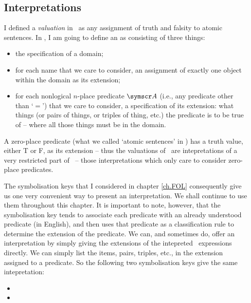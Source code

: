 \begin{earg}
\section{Interpretations} \label{ss.int}
I defined a \emph{valuation} in \TFL\ as any assignment of truth and falsity to atomic sentences. In \FOL, I am going to define an  as consisting of three things:
	\begin{itemize}	
		\item the specification of a domain;
		\item for each name that we care to consider, an assignment of exactly one object within the domain as its extension;
		\item for each nonlogical $n$-place predicate $\meta{A}$ (i.e., any predicate other than `$=$') that we care to consider, a specification of its extension: what things (or pairs of things, or triples of thing, etc.) the predicate is to be true of – where all those things must be in the domain.
	\end{itemize}
A zero-place predicate (what we called `atomic sentences' in \TFL) has a truth value, either T or F, as its extension – thus the valuations of \TFL\ are intepretations of a very restricted part of \FOL\ – those interpretations which only care to consider zero-place predicates.

The symbolisation keys that I considered in chapter \ref{ch.FOL} consequently give us one very convenient way to present an interpretation. We shall continue to use them throughout this chapter. It is important to note, however, that the symbolisation key tends to associate each predicate with an already understood predicate (in English), and then uses that predicate as a classification rule to determine the extension of the predicate. We can, and sometimes do, offer an interpretation by simply giving the extensions of the intepreted \FOL\ expressions directly. We can simply list the items, pairs, triples, etc., in the extension assigned to a predicate. So the following two symbolisation keys give the same intepretation: 
\begin{itemize}
	\item {} 
\item {}
\end{itemize}


\end{earg}
